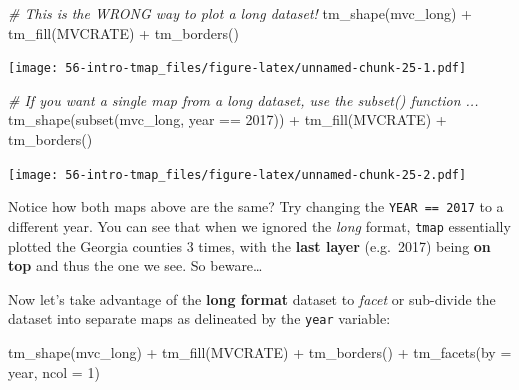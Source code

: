 \documentclass[
]{book}
\newenvironment{Shaded}{\begin{snugshade}}{\end{snugshade}}
\newcommand{\AttributeTok}[1]{\textcolor[rgb]{0.77,0.63,0.00}{#1}}
\newcommand{\CommentTok}[1]{\textcolor[rgb]{0.56,0.35,0.01}{\textit{#1}}}
\newcommand{\DecValTok}[1]{\textcolor[rgb]{0.00,0.00,0.81}{#1}}
\newcommand{\FunctionTok}[1]{\textcolor[rgb]{0.00,0.00,0.00}{#1}}
\newcommand{\NormalTok}[1]{#1}
\newcommand{\SpecialCharTok}[1]{\textcolor[rgb]{0.00,0.00,0.00}{#1}}
\newcommand{\StringTok}[1]{\textcolor[rgb]{0.31,0.60,0.02}{#1}}
\begin{document}
\begin{Shaded}
\begin{Highlighting}[]
\CommentTok{\# This is the WRONG way to plot a long dataset!}
\FunctionTok{tm\_shape}\NormalTok{(mvc\_long) }\SpecialCharTok{+}
  \FunctionTok{tm\_fill}\NormalTok{(}\StringTok{\textquotesingle{}MVCRATE\textquotesingle{}}\NormalTok{) }\SpecialCharTok{+}
  \FunctionTok{tm\_borders}\NormalTok{()}
\end{Highlighting}
\end{Shaded}

\texttt{[image: 56-intro-tmap\_files/figure-latex/unnamed-chunk-25-1.pdf]}

\begin{Shaded}
\begin{Highlighting}[]
\CommentTok{\# If you want a single map from a long dataset, use the subset() function ...}
\FunctionTok{tm\_shape}\NormalTok{(}\FunctionTok{subset}\NormalTok{(mvc\_long, year }\SpecialCharTok{==} \DecValTok{2017}\NormalTok{)) }\SpecialCharTok{+}
  \FunctionTok{tm\_fill}\NormalTok{(}\StringTok{\textquotesingle{}MVCRATE\textquotesingle{}}\NormalTok{) }\SpecialCharTok{+}
  \FunctionTok{tm\_borders}\NormalTok{()}
\end{Highlighting}
\end{Shaded}

\texttt{[image: 56-intro-tmap\_files/figure-latex/unnamed-chunk-25-2.pdf]}

Notice how both maps above are the same? Try changing the \texttt{YEAR\ ==\ 2017} to a different year. You can see that when we ignored the \emph{long} format, \texttt{tmap} essentially plotted the Georgia counties 3 times, with the \textbf{last layer} (e.g.~2017) being \textbf{on top} and thus the one we see. So beware\ldots{}

Now let's take advantage of the \textbf{long format} dataset to \emph{facet} or sub-divide the dataset into separate maps as delineated by the \texttt{year} variable:

\begin{Shaded}
\begin{Highlighting}[]
\FunctionTok{tm\_shape}\NormalTok{(mvc\_long) }\SpecialCharTok{+}
  \FunctionTok{tm\_fill}\NormalTok{(}\StringTok{\textquotesingle{}MVCRATE\textquotesingle{}}\NormalTok{) }\SpecialCharTok{+} 
  \FunctionTok{tm\_borders}\NormalTok{() }\SpecialCharTok{+}
\FunctionTok{tm\_facets}\NormalTok{(}\AttributeTok{by =} \StringTok{\textquotesingle{}year\textquotesingle{}}\NormalTok{, }\AttributeTok{ncol =} \DecValTok{1}\NormalTok{)}
\end{Highlighting}
\end{Shaded}
\end{document}
